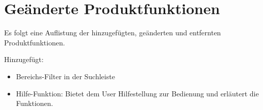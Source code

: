 \FloatBarrier
\section{Geänderte Produktfunktionen}

Es folgt eine Auflistung der hinzugefügten, geänderten und entfernten Produktfunktionen.

Hinzugefügt:
\begin{itemize}
	\item Bereichs-Filter in der Suchleiste
	\item Hilfe-Funktion: Bietet dem User Hilfestellung zur Bedienung und erläutert die Funktionen.
\end{itemize}